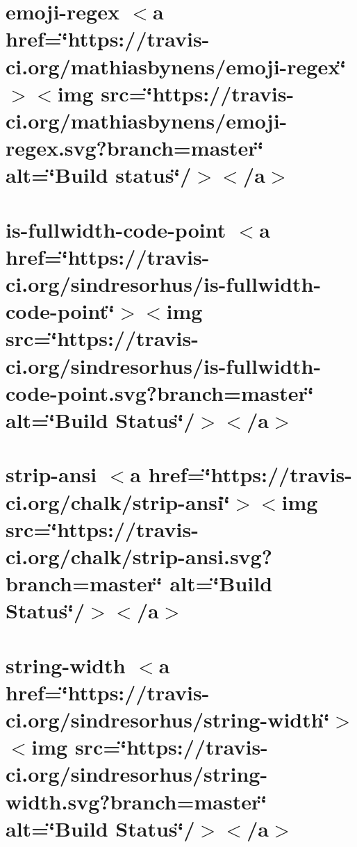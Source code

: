 \let\mypdfximage\pdfximage\def\pdfximage{\immediate\mypdfximage}\documentclass[twoside]{book}
\newcommand{\+}{\discretionary{\mbox{\scriptsize$\hookleftarrow$}}{}{}}
\begin{document}
\chapter{emoji-\/regex $<$a href=\char`\"{}https\+://travis-\/ci.\+org/mathiasbynens/emoji-\/regex\char`\"{}$>$$<$img src=\char`\"{}https\+://travis-\/ci.\+org/mathiasbynens/emoji-\/regex.\+svg?branch=master\char`\"{} alt=\char`\"{}\+Build status\char`\"{}/$>$$<$/a$>$}
\label{md__c_1__git_hub__p_r_o_y_e_c_t_o-_i_i_i-_g_o_t_rest-api_node_modules_string-width_node_modules_emoji-regex__r_e_a_d_m_e}

\chapter{is-\/fullwidth-\/code-\/point $<$a href=\char`\"{}https\+://travis-\/ci.\+org/sindresorhus/is-\/fullwidth-\/code-\/point\char`\"{}$>$$<$img src=\char`\"{}https\+://travis-\/ci.\+org/sindresorhus/is-\/fullwidth-\/code-\/point.\+svg?branch=master\char`\"{} alt=\char`\"{}\+Build Status\char`\"{}/$>$$<$/a$>$}
\label{md__c_1__git_hub__p_r_o_y_e_c_t_o-_i_i_i-_g_o_t_rest-api_node_modules_string-width_node_modules_is-fullwidth-code-point_readme}

\chapter{strip-\/ansi $<$a href=\char`\"{}https\+://travis-\/ci.\+org/chalk/strip-\/ansi\char`\"{}$>$$<$img src=\char`\"{}https\+://travis-\/ci.\+org/chalk/strip-\/ansi.\+svg?branch=master\char`\"{} alt=\char`\"{}\+Build Status\char`\"{}/$>$$<$/a$>$}
\label{md__c_1__git_hub__p_r_o_y_e_c_t_o-_i_i_i-_g_o_t_rest-api_node_modules_string-width_node_modules_strip-ansi_readme}

\chapter{string-\/width $<$a href=\char`\"{}https\+://travis-\/ci.\+org/sindresorhus/string-\/width\char`\"{}$>$$<$img src=\char`\"{}https\+://travis-\/ci.\+org/sindresorhus/string-\/width.\+svg?branch=master\char`\"{} alt=\char`\"{}\+Build Status\char`\"{}/$>$$<$/a$>$}
\label{md__c_1__git_hub__p_r_o_y_e_c_t_o-_i_i_i-_g_o_t_rest-api_node_modules_string-width_readme}

\end{document}

